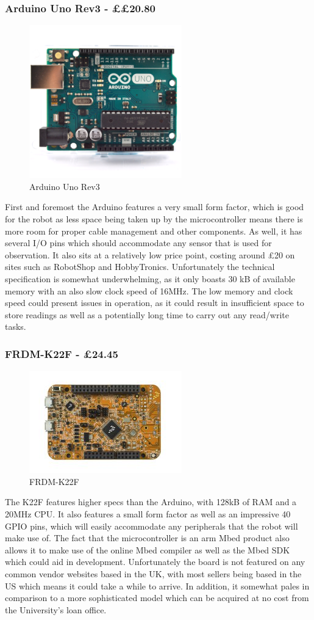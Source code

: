 					\subsubsection{Arduino Uno Rev3 - \pounds{£20.80}}
					\begin{figure}[h]
						\centering
						\includegraphics[width=.3\linewidth]{ANALYSIS/arduinounorev3.png}
						\caption{Arduino Uno Rev3}
						\label{fig:arduinounorev3}
					\end{figure}
					First and foremost the Arduino features a very small form factor, which is good for the robot as less space being taken up by the microcontroller means there is more room for proper cable management and other components. As well, it has several I/O pins which should accommodate any sensor that is used for observation. It also sits at a relatively low price point, costing around \pounds{20} on sites such as RobotShop and HobbyTronics. Unfortunately the technical specification is somewhat underwhelming, as it only boasts 30 kB of available memory with an also slow clock speed of 16MHz. The low memory and clock speed could present issues in operation, as it could result in insufficient space to store readings as well as a potentially long time to carry out any read/write tasks.
				
					\subsubsection{FRDM-K22F - \pounds{24.45}}
					\begin{figure}[h]
						\centering
						\includegraphics[width=.3\linewidth]{ANALYSIS/k22f.png}
						\caption{FRDM-K22F}
						\label{fig:k22f}
					\end{figure}
					The K22F features higher specs than the Arduino, with 128kB of RAM and a 20MHz CPU. It also features a small form factor as well as an impressive 40 GPIO pins, which will easily accommodate any peripherals that the robot will make use of. The fact that the microcontroller is an arm Mbed product also allows it to make use of the online Mbed compiler as well as the Mbed SDK which could aid in development. Unfortunately the board is not featured on any common vendor websites based in the UK, with most sellers being based in the US which means it could take a while to arrive. In addition, it somewhat pales in comparison to a more sophisticated model which can be acquired at no cost from the University's loan office.
					

